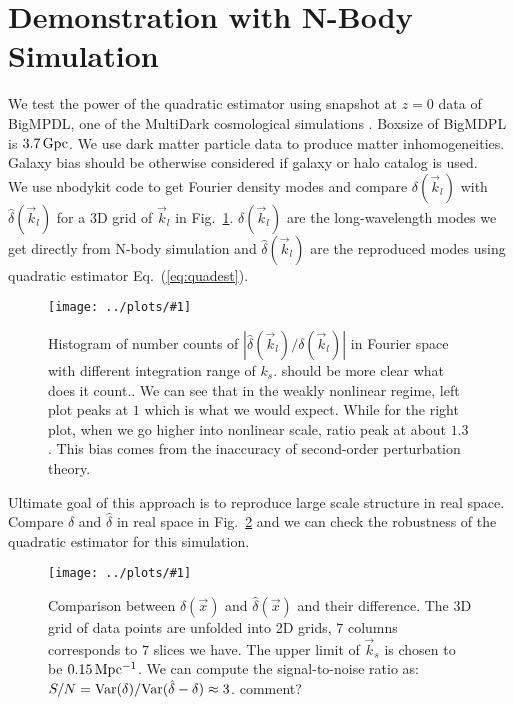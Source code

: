 \documentclass[prd,amsmath,amssymb,floatfix,superscriptaddress,nofootinbib,twocolumn]{revtex4-1}
\newcommand{\Var}{\rm Var}
\newcommand{\vk}{\vec{k}}
\newcommand{\ec}[1]{Eq.~(\ref{eq:#1})}
\newcommand{\rf}[1]{\ref{fig:#1}}
\newcommand{\sfig}[2]{
\texttt{[image: ../plots/\#1]}
        }
\newcommand{\sfigg}[2]{
\texttt{[image: ../plots/\#1]}
        }
\newcommand{\Sfig}[2]{
   \begin{figure}[thbp]
   \begin{center}
    \sfig{../plots/#1.pdf}{\columnwidth}
    \caption{{\small #2}}
    \label{fig:#1}
     \end{center}
   \end{figure}
}
\newcommand{\Sfigg}[2]{
   \begin{figure*}[thbp]
    \sfigg{../plots/#1.pdf}{\columnwidth}
    \caption{{\small #2}}
    \label{fig:#1}
   \end{figure*}
}
\newcommand{\peikai}[1]{{\color{blue} #1}}
\begin{document}
\section{Demonstration with N-Body Simulation}\label{sec3}
We test the power of the quadratic estimator using snapshot at $z=0$ data of BigMPDL, one of the MultiDark cosmological simulations \cite{Klypin:2014nov}. Boxsize of BigMDPL is $3.7\,\rm Gpc$. We use dark matter particle data to produce matter inhomogeneities. Galaxy bias \cite{Desjacques:2018rev} should be otherwise considered if galaxy or halo catalog is used.\\
We use nbodykit code to get Fourier density modes \cite{Hand:2018nby} and compare $\delta(\vk_l)$ with $\hat{\delta}(\vk_l)$ for a 3D grid of $\vk_l$ in Fig.~\rf{hist}. $\delta(\vk_l)$ are the long-wavelength modes we get directly from N-body simulation and $\hat{\delta}(\vk_l)$ are the reproduced modes using quadratic estimator \ec{quadest}.\\
\Sfig{hist}{Histogram of number counts of $|\hat{\delta}(\vk_l)/\delta(\vk_l)|$ in Fourier space with different integration range of $k_s$.\peikai{should be more clear what does it count..} We can see that in the weakly nonlinear regime, left plot peaks at $1$ which is what we would expect. While for the right plot, when we go higher into nonlinear scale, ratio peak at about $1.3$. This bias comes from the inaccuracy of second-order perturbation theory.}
Ultimate goal of this approach is to reproduce large scale structure in real space. Compare $\delta$ and $\hat{\delta}$ in real space in Fig.~\rf{real} and we can check the robustness of the quadratic estimator for this simulation.
\Sfigg{real}{Comparison between $\delta(\vec{x})$ and $\hat{\delta}(\vec{x})$ and their difference. The 3D grid of data points are unfolded into 2D grids, $7$ columns corresponds to $7$ slices we have. The upper limit of $\vk_s$ is chosen to be $0.15 \, \rm Mpc^{-1}$. We can compute the signal-to-noise ratio as: $S/N=\Var(\delta)/\Var(\hat{\delta}-\delta)\approx 3$.\peikai{comment?}}
\end{document}
